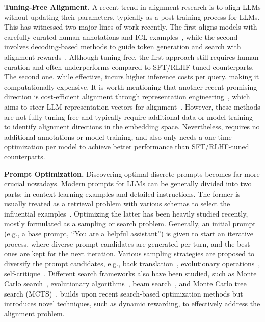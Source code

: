 \noindent \textbf{Tuning-Free Alignment.}
A recent trend in alignment research is to align LLMs without updating their parameters, typically as a post-training process for LLMs. This has witnessed two major lines of work recently. The first aligns models with carefully curated human annotations and ICL examples~\cite{han2023context, Lin2024ReAlign, zhao2024context}, while the second involves decoding-based methods to guide token generation and search with alignment rewards~\cite{li2023rain, khanov2024args, huang2024deal}. Although tuning-free, the first approach still requires human curation and often underperforms compared to SFT/RLHF-tuned counterparts. The second one, while effective, incurs higher inference costs per query, making it computationally expensive. It is worth mentioning that another recent promising direction is cost-efficient alignment through representation engineering~\cite{zou2023representation, wu2024reft}, which aims to steer LLM representation vectors for alignment~\cite{li2024inference, kong2024aligning, wang2024inferaligner}. However, these methods are not fully tuning-free and typically require additional data or model training to identify alignment directions in the embedding space. Nevertheless, \ours requires no additional annotations or model training, and also only needs a one-time optimization per model to achieve better performance than SFT/RLHF-tuned counterparts. 







\noindent \textbf{Prompt Optimization.}
Discovering optimal discrete prompts becomes far more crucial nowadays. Modern prompts for LLMs can be generally divided into two parts: in-context learning examples and detailed instructions. The former is usually treated as a retrieval problem with various schemas to select the influential examples~\cite{rubin2021learning, dong2022survey}. Optimizing the latter has been heavily studied recently, mostly formulated as a sampling or search problem. Generally, an initial prompt (e.g., a base prompt, ``You are a helpful assistant'') is given to start an iterative process, where diverse prompt candidates are generated per turn, and the best ones are kept for the next iteration. Various sampling strategies are proposed to diversify the prompt candidates, e.g., back translation~\cite{xu2022gps}, evolutionary operations~\cite{fernando2023promptbreeder}, self-critique~\cite{wang2023promptagent}. Different search frameworks also have been studied, such as Monte Carlo search~\cite{zhou2022large}, evolutionary algorithms~\cite{fernando2023promptbreeder, yang2023large}, beam search~\cite{pryzant2023automatic}, and Monte Carlo tree search (MCTS)~\cite{wang2023promptagent}. \ours builds upon recent search-based optimization methods but introduces novel techniques, such as dynamic rewarding, to effectively address the alignment problem. 